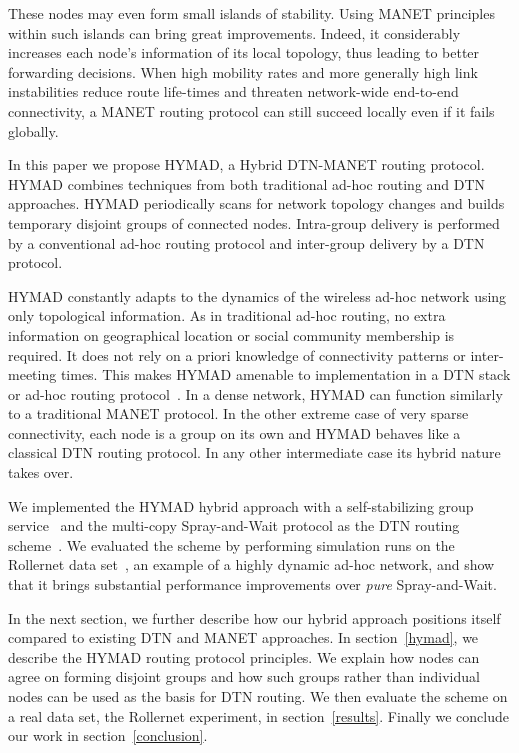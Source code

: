 \documentclass[10pt,twocolumn,letterpaper]{article}
\begin{document}
These nodes may even form small islands of stability. Using MANET
principles within such islands can bring great improvements. Indeed,
it considerably increases each node's information of its local
topology, thus leading to better forwarding decisions.  When high
mobility rates and more generally high link instabilities reduce route
life-times and threaten network-wide end-to-end connectivity, a MANET
routing protocol can still succeed locally even if it fails globally.

In this paper we propose HYMAD, a Hybrid DTN-MANET routing protocol.
HYMAD combines techniques from both traditional ad-hoc routing and DTN
approaches. HYMAD periodically scans for network topology changes and
builds temporary disjoint groups of connected nodes. Intra-group
delivery is performed by a conventional ad-hoc routing protocol and
inter-group delivery by a DTN protocol.

HYMAD constantly adapts to the dynamics of the wireless ad-hoc network
using only topological information. As in traditional ad-hoc routing,
no extra information on geographical location or social community
membership is required. It does not rely on a priori knowledge of
connectivity patterns or inter-meeting times. This makes HYMAD
amenable to implementation in a DTN stack or ad-hoc routing
protocol~\cite{JOTT06}. In a dense network, HYMAD can function
similarly to a traditional MANET protocol. In the other extreme case
of very sparse connectivity, each node is a group on its own and HYMAD behaves like
a classical DTN routing protocol. In any other intermediate case its
hybrid nature takes over.

We implemented the HYMAD hybrid approach with a self-stabilizing group
service~\cite{r_operators,DKP08} and the multi-copy Spray-and-Wait
protocol as the DTN routing scheme~\cite{spyro_sw}. We evaluated the
scheme by performing simulation runs on the Rollernet data
set~\cite{tournoux08_rollernet}, an example of a highly dynamic ad-hoc
network, and show that it brings substantial performance improvements
over \textit{pure} Spray-and-Wait.

In the next section, we further describe how our hybrid approach
positions itself compared to existing DTN and MANET approaches.  In
section~\ref{hymad}, we describe the HYMAD routing protocol
principles. We explain how nodes can agree on forming disjoint groups
and how such groups rather than individual nodes can be used as the
basis for DTN routing. We then evaluate the scheme on a real data set,
the Rollernet experiment, in section~\ref{results}. 
Finally we conclude our work in
section~\ref{conclusion}.
\end{document}
